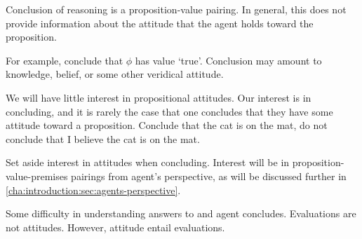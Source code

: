 \begin{note}
  Conclusion of reasoning is a proposition-value pairing.
  In general, this does not provide information about the attitude that the agent holds toward the proposition.

  For example, conclude that \(\phi\) has value `true'.
  Conclusion may amount to knowledge, belief, or some other veridical attitude.

  We will have little interest in propositional attitudes.
  Our interest is in concluding, and it is rarely the case that one concludes that they have some attitude toward a proposition.
  Conclude that the cat is on the mat, do not conclude that I believe the cat is on the mat.

  Set aside interest in attitudes when concluding.
  Interest will be in proposition-value-premises pairings from agent's perspective, as will be discussed further in \autoref{cha:introduction:sec:agents-perspective}.
\end{note}

\begin{note}
  Some difficulty in understanding answers to \qWhy{} and agent concludes.
  Evaluations are not attitudes.
  However, attitude entail evaluations.
\end{note}

